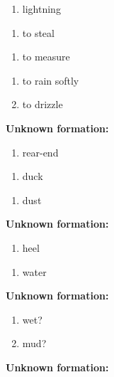 \begin{enumerate}
\item lightning
\end{enumerate}
\begin{enumerate}
\item to steal
\end{enumerate}
\begin{enumerate}
\item to measure
\end{enumerate}
\begin{enumerate}
\item to rain softly
\item to drizzle
\end{enumerate}
\noindent\textbf{Unknown formation:}\\

\begin{enumerate}
\item rear-end
\end{enumerate}
\begin{enumerate}
\item duck
\end{enumerate}
\begin{enumerate}
\item dust
\end{enumerate}
\noindent\textbf{Unknown formation:}\\

\begin{enumerate}
\item heel
\end{enumerate}
\begin{enumerate}
\item water
\end{enumerate}
\noindent\textbf{Unknown formation:}\\

\begin{enumerate}
\item wet?
\item mud?
\end{enumerate}
\noindent\textbf{Unknown formation:}\\


